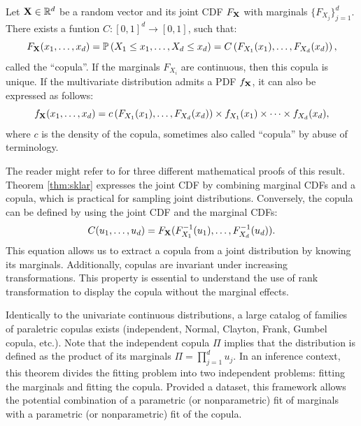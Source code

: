 \begin{theorem}
    Let $\mathbf{X} \in \mathbb{R}^d$ be a random vector and its joint CDF $F_{{\bf X}}$ with marginals $\{F_{X_j}\}_{j=1}^d$. There exists a funtion $C: [0, 1]^d \rightarrow [0, 1]$, such that:
    \begin{equation}
        F_{{\bf X}}(x_1, \dots, x_d) = \mathbb{P}\left(X_1\leq x_1,\dots ,X_d\leq x_d\right) = C\left(F_{X_1}(x_1), \dots, F_{X_d}(x_d)\right), 
    \end{equation}
    called the ``copula''. 
    If the marginals $F_{X_i}$ are continuous, then this copula is unique. 
    If the multivariate distribution admits a PDF $f_{{\bf X}}$, it can also be expressed as follows:
    \begin{equation}
        f_{{\bf X}}(x_1, \dots, x_d) = c\left(F_{X_1}(x_1), \dots, F_{X_d}(x_d)\right) \times f_{X_1}(x_1) \times \dots \times f_{X_d}(x_d),
    \end{equation}
    where $c$ is the density of the copula, sometimes also called ``copula'' by abuse of terminology. 
    \label{thm:sklar}
\end{theorem}

The reader might refer to \citet[Chap. 2]{durante_2015_copula} for three different mathematical proofs of this result. 
Theorem \ref{thm:sklar} expresses the joint CDF by combining marginal CDFs and a copula, which is practical for sampling joint distributions. 
Conversely, the copula can be defined by using the joint CDF and the marginal CDFs: 
\begin{equation}
    C(u_1, \dots, u_d) = F_{{\bf X}}(F^{-1}_{X_1}(u_1), \dots, F^{-1}_{X_d}(u_d)).
\end{equation}
This equation allows us to extract a copula from a joint distribution by knowing its marginals.
Additionally, copulas are invariant under increasing transformations. 
This property is essential to understand the use of rank transformation to display the copula without the marginal effects.     

Identically to the univariate continuous distributions, a large catalog of families of paraletric copulas exists (independent, Normal, Clayton, Frank, Gumbel copula, etc.). 
Note that the independent copula $\Pi$ implies that the distribution is defined as the product of its marginals $\Pi = \prod_{j=1}^d u_j$. 
In an inference context, this theorem divides the fitting problem into two independent problems: fitting the marginals and fitting the copula. 
Provided a dataset, this framework allows the potential combination of a parametric (or nonparametric) fit of marginals with a parametric (or nonparametric) fit of the copula. 


